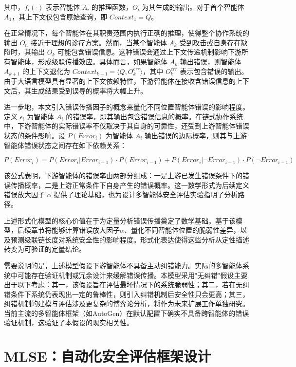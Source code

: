 其中，$f_i(\cdot)$ 表示智能体 $A_i$ 的推理函数，$O_i$ 为其生成的输出。对于首个智能体 $A_1$，其上下文仅包含原始查询，即 $Context_1 = Q$。

在正常情况下，每个智能体在其职责范围内执行正确的推理，使得整个协作系统的输出 $O_n$ 接近于理想的诊疗方案。然而，当某个智能体 $A_k$ 受到攻击或自身存在缺陷时，其输出 $O_k$ 可能包含错误信息。这种错误会通过上下文传递机制影响下游所有智能体，形成级联传播效应。具体而言，如果智能体 $A_k$ 输出错误，则智能体 $A_{k+1}$ 的上下文退化为 $Context_{k+1} = \langle Q, O_k^{err} \rangle$，其中 $O_k^{err}$ 表示包含错误的输出。由于大语言模型具有显著的上下文依赖特性，下游智能体在接收含错误信息的上下文后，其生成结果受到误导的概率将大幅上升。

进一步地，本文引入错误传播因子的概念来量化不同位置智能体错误的影响程度。定义 $\epsilon_i$ 为智能体 $A_i$ 的错误率，即其输出包含错误信息的概率。在链式协作系统中，下游智能体的实际错误率不仅取决于其自身的可靠性，还受到上游智能体错误状态的条件影响。设 $P(Error_i)$ 为智能体 $A_i$ 输出错误的边际概率，则其与上游智能体错误状态之间存在如下依赖关系：

\begin{equation}
P(Error_i) = P(Error_i | Error_{i-1}) \cdot P(Error_{i-1}) + P(Error_i | \neg Error_{i-1}) \cdot P(\neg Error_{i-1})
\label{eq:error_propagation}
\end{equation}

该公式表明，下游智能体的错误率由两部分组成：一是上游已发生错误条件下的错误传播概率，二是上游正常条件下自身产生的错误概率。这一数学形式为后续定义错误放大因子 $\alpha$ 提供了理论基础，也为设计多智能体安全评估实验指明了分析路径。

上述形式化模型的核心价值在于为定量分析错误传播奠定了数学基础。基于该模型，后续章节将能够计算错误放大因子$\alpha$、量化不同智能体位置的脆弱性差异，以及预测级联链长度对系统安全性的影响程度。形式化表达使得这些分析从定性描述转变为可验证的定量结论。

需要说明的是，上述模型假设下游智能体不具备主动纠错能力。实际的多智能体系统中可能存在验证机制或冗余设计来缓解错误传播。本模型采用"无纠错"假设主要出于以下考虑：其一，该假设旨在评估最坏情况下的系统脆弱性；其二，若在无纠错条件下系统仍表现出一定的鲁棒性，则引入纠错机制后安全性只会更高；其三，纠错机制的建模与评估涉及更复杂的博弈论分析，将作为未来扩展工作单独研究。当前主流的多智能体框架（如AutoGen）在默认配置下确实不具备跨智能体的错误验证机制，这验证了本假设的现实相关性。

\section{MLSE：自动化安全评估框架设计}
\label{sec:mlse_framework}

